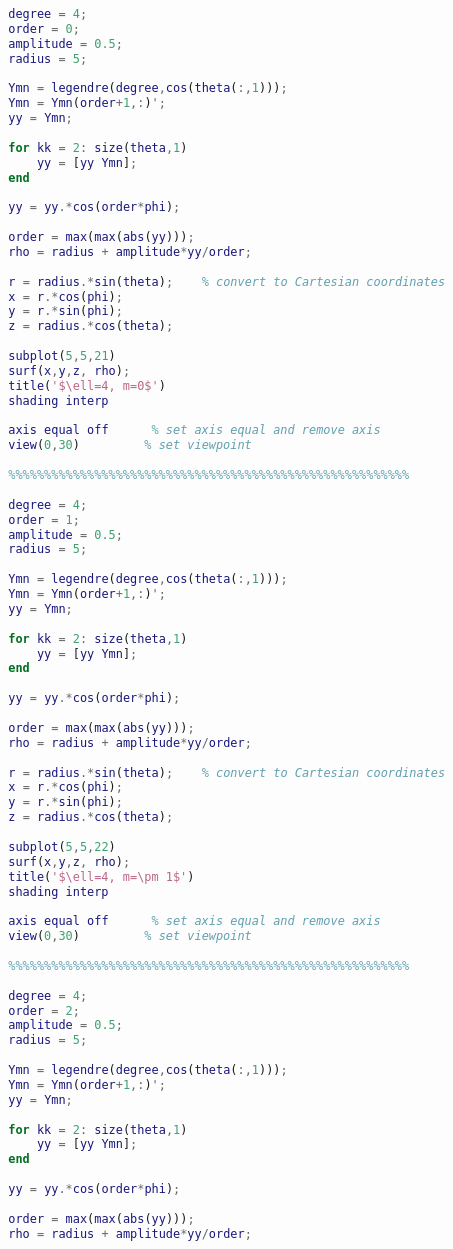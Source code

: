\begin{lstlisting}[language=MATLAB]
		%%%%%%%%%%%%%%%%%%%%%%%%%%%%%%%%%%%%%%%%%%%%%%%%%%%%%%%%
		
		degree = 4;
		order = 0;
		amplitude = 0.5;
		radius = 5;
		
		Ymn = legendre(degree,cos(theta(:,1)));
		Ymn = Ymn(order+1,:)';
		yy = Ymn;
		
		for kk = 2: size(theta,1)
		    yy = [yy Ymn];
		end
		
		yy = yy.*cos(order*phi);
		
		order = max(max(abs(yy)));
		rho = radius + amplitude*yy/order;
		
		r = radius.*sin(theta);    % convert to Cartesian coordinates
		x = r.*cos(phi);
		y = r.*sin(phi);
		z = radius.*cos(theta);
		
		subplot(5,5,21)
		surf(x,y,z, rho);
		title('$\ell=4, m=0$')
		shading interp
		
		axis equal off      % set axis equal and remove axis
		view(0,30)         % set viewpoint
		
		%%%%%%%%%%%%%%%%%%%%%%%%%%%%%%%%%%%%%%%%%%%%%%%%%%%%%%%%
		
		degree = 4;
		order = 1;
		amplitude = 0.5;
		radius = 5;
		
		Ymn = legendre(degree,cos(theta(:,1)));
		Ymn = Ymn(order+1,:)';
		yy = Ymn;
		
		for kk = 2: size(theta,1)
		    yy = [yy Ymn];
		end
		
		yy = yy.*cos(order*phi);
		
		order = max(max(abs(yy)));
		rho = radius + amplitude*yy/order;
		
		r = radius.*sin(theta);    % convert to Cartesian coordinates
		x = r.*cos(phi);
		y = r.*sin(phi);
		z = radius.*cos(theta);
		
		subplot(5,5,22)
		surf(x,y,z, rho);
		title('$\ell=4, m=\pm 1$')
		shading interp
		
		axis equal off      % set axis equal and remove axis
		view(0,30)         % set viewpoint
		
		%%%%%%%%%%%%%%%%%%%%%%%%%%%%%%%%%%%%%%%%%%%%%%%%%%%%%%%%
		
		degree = 4;
		order = 2;
		amplitude = 0.5;
		radius = 5;
		
		Ymn = legendre(degree,cos(theta(:,1)));
		Ymn = Ymn(order+1,:)';
		yy = Ymn;
		
		for kk = 2: size(theta,1)
		    yy = [yy Ymn];
		end
		
		yy = yy.*cos(order*phi);
		
		order = max(max(abs(yy)));
		rho = radius + amplitude*yy/order;
		

\end{lstlisting}

